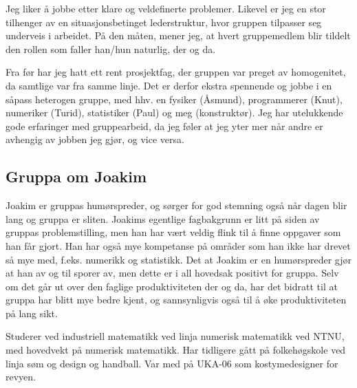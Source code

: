 Jeg liker å jobbe etter klare og veldefinerte problemer. Likevel
er jeg en stor tilhenger av en situasjonsbetinget lederstruktur, hvor gruppen
tilpasser seg underveis i arbeidet. På den måten, mener jeg, at hvert
gruppemedlem blir tildelt den rollen som faller han/hun naturlig, der og da. 

Fra før har jeg hatt ett rent prosjektfag, der  gruppen var preget av
homogenitet, da samtlige var fra samme linje. Det er derfor ekstra spennende og
jobbe i en såpass heterogen gruppe, med hhv. en fysiker (Åsmund), programmerer
(Knut), numeriker (Turid), statistiker (Paul) og meg (konstruktør). Jeg har
utelukkende gode erfaringer med gruppearbeid, da jeg føler at jeg yter mer når
andre er avhengig av jobben jeg gjør, og vice versa.


\subsection*{Gruppa om Joakim}
Joakim er gruppas humørspreder, og sørger for god stemning også når dagen blir
lang og gruppa er sliten. Joakims egentlige fagbakgrunn er litt på siden av
gruppas problemstilling, men han har vært veldig flink til å finne oppgaver som
han får gjort. Han har også mye kompetanse på områder som han ikke har drevet så
mye med, f.eks. numerikk og statistikk. Det at Joakim er en humørspreder gjør at 
han av og til sporer av, men dette er i all hovedsak positivt for gruppa. Selv om 
det går ut over den faglige produktiviteten der og da, har det bidratt til at 
gruppa har blitt mye bedre kjent, og sannsynligvis også til å øke produktiviteten 
på lang sikt.

Studerer ved industriell matematikk ved linja numerisk matematikk ved NTNU, med hovedvekt på numerisk matematikk. Har tidligere gått på folkehøgskole ved linja søm og design og handball. Var med på UKA-06 som kostymedesigner for revyen.

